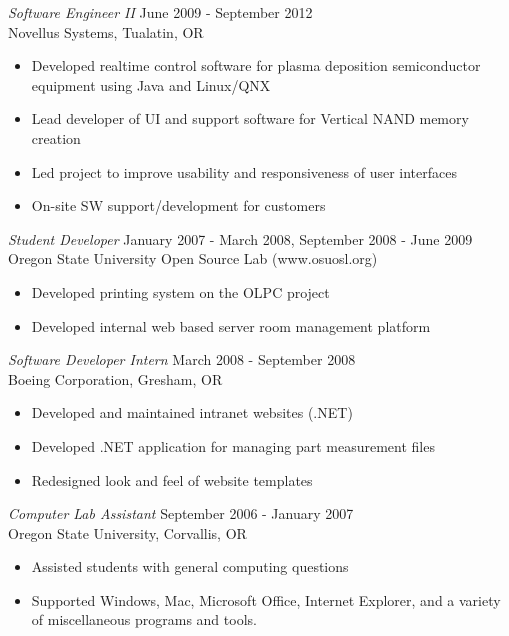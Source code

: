\documentclass[margin]{res}
\begin{document}
\begin{resume}
                {\sl Software Engineer II} \hfill June 2009 -  September 2012 \\
                Novellus Systems,  Tualatin, OR 
                 \begin{itemize}  \itemsep -2pt
                    \item Developed realtime control software for plasma deposition semiconductor equipment using Java and Linux/QNX
                    \item Lead developer of UI and support software for Vertical NAND memory creation 
                    \item Led project to improve usability and responsiveness of user interfaces
                    \item On-site SW support/development for customers
                \end{itemize}
                
                {\sl Student Developer} \hfill            January 2007 - March 2008, September 2008 - June 2009 \\
                Oregon State University Open Source Lab (www.osuosl.org)
                 \begin{itemize}  \itemsep -2pt %
                     \item Developed printing system on the OLPC project
                     \item Developed internal web based server room management platform
                 \end{itemize}

                {\sl Software Developer Intern} \hfill         March 2008 - September 2008\\
                Boeing Corporation, Gresham, OR
               	\begin{itemize}  \itemsep -2pt %
                    \item Developed and maintained intranet websites (.NET)
                    \item Developed .NET application for managing part measurement files
                    \item Redesigned look and feel of website templates
               	\end{itemize}

                {\sl Computer Lab Assistant} \hfill         September 2006 - January 2007\\
                Oregon State University, Corvallis, OR
                \begin{itemize}  \itemsep -2pt %
                    \item Assisted students with general computing questions
                    \item Supported Windows, Mac, Microsoft Office, Internet Explorer, and a variety
                        of miscellaneous programs and tools.
                \end{itemize}

\end{resume}
\end{document}
